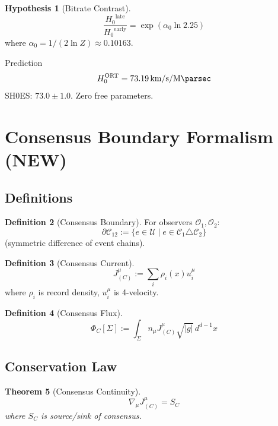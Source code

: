 \documentclass[12pt,a4paper]{article}
\numberwithin{equation}{section}
\theoremstyle{plain}
\newtheorem{theorem}{Theorem}[section]
\theoremstyle{definition}
\newtheorem{definition}[theorem]{Definition}
\newtheorem{hypothesis}[theorem]{Hypothesis}
\theoremstyle{remark}
\newcommand{\Universe}{\ensuremath{\mathcal{U}}}
\newcommand{\Observer}{\ensuremath{\mathcal{O}}}
\newcommand{\Chain}{\ensuremath{\mathcal{C}}}
\newcommand{\Zed}{\ensuremath{Z}}
\newcommand{\alphazero}{\ensuremath{\alpha_0}}
\newcommand{\Hzero}{\ensuremath{H_0}}
\newcommand{\PhiC}{\ensuremath{\Phi_C}}
\newcommand{\JC}{\ensuremath{J^{\mu}_{(C)}}}
\newcommand{\SC}{\ensuremath{S_C}}
\begin{document}
\begin{hypothesis}[Bitrate Contrast]
\[
\boxed{\frac{\Hzero^{\mathrm{late}}}{\Hzero^{\mathrm{early}}} = \exp(\alphazero\ln 2.25)}
\]
where $\alphazero = 1/(2\ln\Zed) \approx 0.10163$.
\end{hypothesis}

\begin{resultbox}{Prediction}
\[
\Hzero^{\mathrm{ORT}} = \SI{73.19}{\kilo\meter\per\second\per\mega\parsec}
\]
SH0ES: $73.0 \pm 1.0$. Zero free parameters.
\end{resultbox}

\section{Consensus Boundary Formalism (NEW)}
\label{sec:consensus-boundary}

\subsection{Definitions}

\begin{definition}[Consensus Boundary]
\label{def:boundary}
For observers $\Observer_1, \Observer_2$:
\[
\partial\Chain_{12} := \{e \in \Universe \mid e \in \Chain_1 \triangle \Chain_2\}
\]
(symmetric difference of event chains).
\end{definition}

\begin{definition}[Consensus Current]
\label{def:current}
\[
\boxed{\JC := \sum_i \rho_i(x) u^{\mu}_i}
\]
where $\rho_i$ is record density, $u^{\mu}_i$ is 4-velocity.
\end{definition}

\begin{definition}[Consensus Flux]
\label{def:flux}
\[
\boxed{\PhiC[\Sigma] := \int_{\Sigma} n_{\mu} \JC \sqrt{|g|}\, d^{d-1}x}
\]
\end{definition}

\subsection{Conservation Law}

\begin{theorem}[Consensus Continuity]
\label{thm:continuity}
\[
\boxed{\nabla_{\mu} \JC = \SC}
\]
where $\SC$ is source/sink of consensus.
\end{theorem}
\end{document}
